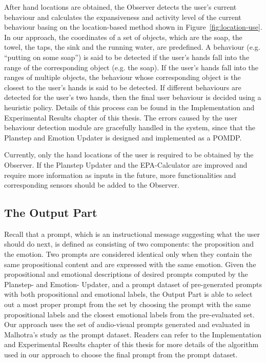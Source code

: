After hand locations are obtained, the Observer detects the user's current behaviour and calculates the expansiveness and activity level of the current behaviour basing on the location-based method shown in Figure~\ref{fig:location-use}. In our approach, the coordinates of a set of objects, which are the soap, the towel, the taps, the sink and the running water, are predefined. A behaviour (e.g. ``putting on some soap'') is said to be detected if the user's hands fall into the range of the corresponding object (e.g. the soap). If the user's hands fall into the ranges of multiple objects, the behaviour whose corresponding object is the closest to the user's hands is said to be detected. If different behaviours are detected for the user's two hands, then the final user behaviour is decided using a heuristic policy. Details of this process can be found in the Implementation and Experimental Results chapter of this thesis. The errors caused by the user behaviour detection module are gracefully handled in the system, since that the Planstep and Emotion Updater is designed and implemented as a POMDP.

Currently, only the hand locations of the user is required to be obtained by the Observer. If the Planstep Updater and the EPA-Calculator are improved and require more information as inputs in the future, more functionalities and corresponding sensors should be added to the Observer.

\subsection{The Output Part}

Recall that a prompt, which is an instructional message suggesting what the user should do next, is defined as consisting of two components: the proposition and the emotion. Two prompts are considered identical only when they contain the same propositional content and are expressed with the same emotion. Given the propositional and emotional descriptions of desired prompts computed by the Planstep- and Emotion- Updater, and a prompt dataset of pre-generated prompts with both propositional and emotional labels, the Output Part is able to select out a most proper prompt from the set by choosing the prompt with the same propositional labels and the closest emotional labels from the pre-evaluated set. Our approach uses the set of audio-visual prompts generated and evaluated in Malhotra's study \cite{malhotra2014} as the prompt dataset. Readers can refer to the Implementation and Experimental Results chapter of this thesis for more details of the algorithm used in our approach to choose the final prompt from the prompt dataset.

